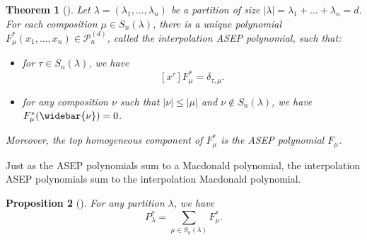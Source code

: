 \documentclass[12pt]{amsart}
\newtheorem{thm}{Theorem}[section]
\newtheorem{prop}[thm]{Proposition}
\theoremstyle{definition}
\newcommand{\mcP}{\mathcal P}
\begin{document}
\begin{thm}[{\cite[Theorem 2.17]{BenDaliWilliams2025}}]
    Let $\lambda=(\lambda_1,\dots,\lambda_n)$ be a partition of size
    $|\lambda|=\lambda_1+ \dots + \lambda_n=d$.  For each composition $\mu\in S_n(\lambda)$, there is a unique polynomial $F^*_\mu(x_1,\dots,x_n)\in \mcP_n^{(d)}$, called the \emph{interpolation ASEP polynomial}, such that:
    \begin{itemize}
     \item for $\tau \in S_n(\lambda)$, we have 
     \begin{equation}\label{eq:normalization_F}
         [x^\tau]F^*_\mu =\delta_{\tau,\mu}.
     \end{equation}
        \item for any composition $\nu$ such that $|\nu|\leq |\mu|$ and $\nu\notin S_n(\lambda)$, we have
        $F^*_\mu(\widebar{\nu})=0$.
    \end{itemize}
Moreover, the top homogeneous component of $F^*_\mu$ is the ASEP polynomial $F_\mu$. 
\end{thm}

Just as the ASEP polynomials sum to a Macdonald polynomial, the interpolation ASEP polynomials sum to the interpolation Macdonald polynomial.  %

\begin{prop}[{\cite[Proposition 2.15]{BenDaliWilliams2025}}]
\label{prop:symmetrization}For any partition $\lambda$, we have $$P^*_\lambda=\sum_{\mu\in S_n(\lambda)}F^*_\mu.$$
\end{prop}

\fi
\end{document}
